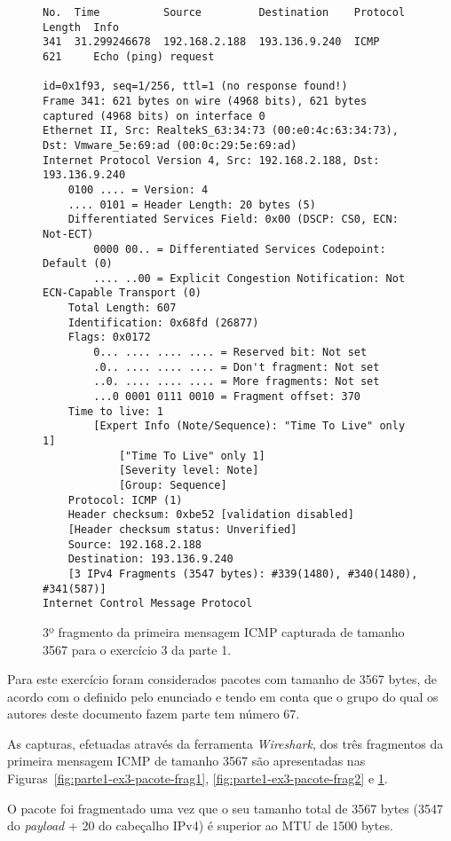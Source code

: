 \begin{figure}[ht]
  \centering
\begin{Verbatim}[fontsize=\scriptsize]
No.  Time          Source         Destination    Protocol  Length  Info
341  31.299246678  192.168.2.188  193.136.9.240  ICMP      621     Echo (ping) request

id=0x1f93, seq=1/256, ttl=1 (no response found!)
Frame 341: 621 bytes on wire (4968 bits), 621 bytes captured (4968 bits) on interface 0
Ethernet II, Src: RealtekS_63:34:73 (00:e0:4c:63:34:73), Dst: Vmware_5e:69:ad (00:0c:29:5e:69:ad)
Internet Protocol Version 4, Src: 192.168.2.188, Dst: 193.136.9.240
    0100 .... = Version: 4
    .... 0101 = Header Length: 20 bytes (5)
    Differentiated Services Field: 0x00 (DSCP: CS0, ECN: Not-ECT)
        0000 00.. = Differentiated Services Codepoint: Default (0)
        .... ..00 = Explicit Congestion Notification: Not ECN-Capable Transport (0)
    Total Length: 607
    Identification: 0x68fd (26877)
    Flags: 0x0172
        0... .... .... .... = Reserved bit: Not set
        .0.. .... .... .... = Don't fragment: Not set
        ..0. .... .... .... = More fragments: Not set
        ...0 0001 0111 0010 = Fragment offset: 370
    Time to live: 1
        [Expert Info (Note/Sequence): "Time To Live" only 1]
            ["Time To Live" only 1]
            [Severity level: Note]
            [Group: Sequence]
    Protocol: ICMP (1)
    Header checksum: 0xbe52 [validation disabled]
    [Header checksum status: Unverified]
    Source: 192.168.2.188
    Destination: 193.136.9.240
    [3 IPv4 Fragments (3547 bytes): #339(1480), #340(1480), #341(587)]
Internet Control Message Protocol
\end{Verbatim}
  \caption{3º fragmento da primeira mensagem ICMP capturada de tamanho 3567 para
  o exercício 3 da parte 1.}
  \label{fig:parte1-ex3-pacote-frag3}
\end{figure}

Para este exercício foram considerados pacotes com tamanho de 3567 bytes, de
acordo com o definido pelo enunciado e tendo em conta que o grupo do qual os
autores deste documento fazem parte tem número 67.

As capturas, efetuadas através da ferramenta \emph{Wireshark}, dos três
fragmentos da primeira mensagem ICMP de tamanho 3567 são apresentadas nas
Figuras~\ref{fig:parte1-ex3-pacote-frag1}, \ref{fig:parte1-ex3-pacote-frag2} e
\ref{fig:parte1-ex3-pacote-frag3}.


O pacote foi fragmentado uma vez que o seu tamanho total de 3567 bytes (3547 do
\emph{payload} + 20 do cabeçalho IPv4) é superior ao MTU de 1500 bytes.

